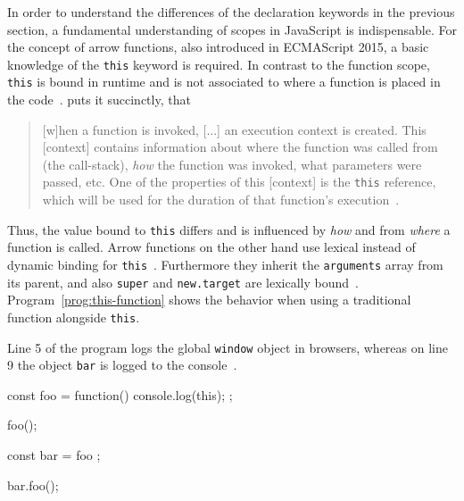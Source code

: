 In order to understand the differences of the declaration keywords in the previous section, a fundamental understanding of scopes in JavaScript is indispensable. For the concept of arrow functions, also introduced in ECMAScript 2015, a basic knowledge of the \texttt{this} keyword is required. In contrast to the function scope, \texttt{this} is bound in runtime and is not associated to where a function is placed in the code~\cite[p.~9]{YDKJS:ThisAndObjectPrototypes:Simpson:2015}. \citeauthor{YDKJS:ThisAndObjectPrototypes:Simpson:2015} puts it succinctly, that
\begin{quote}
  [w]hen a function is invoked, [...] an execution context is created. This [context] contains information about where the function was called from (the call-stack), \emph{how} the function was invoked, what parameters were passed, etc. One of the properties of this [context] is the \texttt{this} reference, which will be used for the duration of that function’s execution~\cite[p.~1]{YDKJS:ThisAndObjectPrototypes:Simpson:2015}.
\end{quote}
Thus, the value bound to \texttt{this} differs and is influenced by \emph{how} and from \emph{where} a function is called. Arrow functions on the other hand use lexical instead of dynamic binding for \texttt{this}~\cite[p.~58]{YDKJS:ES6AndBeyond:Simpson:2015}. Furthermore they inherit the \texttt{arguments} array from its parent, and also \texttt{super} and \texttt{new.target} are lexically bound~\cite[p.~59]{YDKJS:ES6AndBeyond:Simpson:2015}. Program~\ref{prog:this-function} shows the behavior when using a traditional function alongside \texttt{this}.
\begin{program}
\caption{Line 5 of the program logs the global \texttt{window} object in browsers, whereas on line 9 the object \texttt{bar} is logged to the console~\cite[p.~18]{TypeScriptBook:Syed:2017}.}
\label{prog:this-function}
\begin{JsCode}
const foo = function() {
  console.log(this);
};

foo();

const bar = { foo };

bar.foo();
\end{JsCode}
\end{program}

